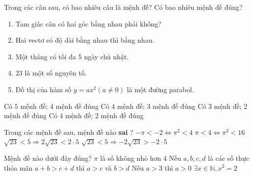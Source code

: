 \begin{ex}%
Trong các câu sau, có bao nhiêu câu là mệnh đề? Có bao nhiêu mệnh đề đúng?
\begin{enumerate}
\item Tam giác cân có hai góc bằng nhau phải không?
\item Hai vectơ có độ dài bằng nhau thì bằng nhau.
\item Một tháng có tối đa 5 ngày chủ nhật.
\item $23$ là một số nguyên tố.
\item Đồ thị của hàm số $y=ax^2(a \neq 0)$ là một đường parabol.
\end{enumerate}
\choice
{Có $5$ mệnh đề; $4$ mệnh đề đúng}
{\True Có $4$ mệnh đề; $3$ mệnh đề đúng}
{Có $3$ mệnh đề; $2$ mệnh đề đúng}
{Có $4$ mệnh đề; $2$ mệnh đề đúng}
\end{ex}
\begin{ex}%
Trong các mệnh đề sau, mệnh đề nào \textbf{sai} ?
\choice 
{ \True $-\pi <-2\Leftrightarrow {{\pi }^2}<4$}
{ $\pi <4\Leftrightarrow {{\pi }^2}<16$} 
{ $\sqrt{23}<5\Rightarrow 2\sqrt{23}<2\cdot5$}
{ $\sqrt{23}<5\Rightarrow -2\sqrt{23}>-2\cdot5$}
\end{ex} 
\begin{ex}%
Mệnh đề nào dưới đây đúng?
\choice 
{ $\pi$ là số không nhỏ hơn 4} 
{ Nếu $a, b, c, d$ là các số thực thỏa mãn $a+b>c+d$ thì $a>c$ và $b>d$} 
{ \True Nếu $a>3$ thì $a>0$} 
{ $\exists x\in \mathbb{N},x^2=2$ }
\end{ex}

